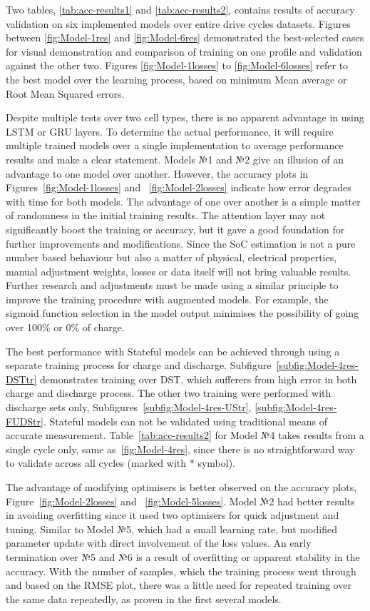 Two tables, \ref{tab:acc-results1} and \ref{tab:acc-results2}, contains results of accuracy validation on six implemented models over entire drive cycles datasets.
Figures between \ref{fig:Model-1res} and \ref{fig:Model-6res} demonstrated the best-selected cases for visual demonstration and comparison of training on one profile and validation against the other two.
Figures \ref{fig:Model-1losses} to \ref{fig:Model-6losses} refer to the best model over the learning process, based on minimum Mean average or Root Mean Squared errors.

%
%
Despite multiple tests over two cell types, there is no apparent advantage in using LSTM or GRU layers.
To determine the actual performance, it will require multiple trained models over a single implementation to average performance results and make a clear statement.
Models №1 and №2 give an illusion of an advantage to one model over another.
However, the accuracy plots in Figures~\ref{fig:Model-1losses} and ~\ref{fig:Model-2losses} indicate how error degrades with time for both models.
The advantage of one over another is a simple matter of randomness in the initial training results.
The attention layer may not significantly boost the training or accuracy, but it gave a good foundation for further improvements and modifications.
Since the SoC estimation is not a pure number based behaviour but also a matter of physical, electrical properties, manual adjustment weights, losses or data itself will not bring valuable results.
Further research and adjustments must be made using a similar principle to improve the training procedure with augmented models. 
For example, the sigmoid function selection in the model output minimises the possibility of going over 100\% or 0\% of charge.

%
%
The best performance with Stateful models can be achieved through using a separate training process for charge and discharge. 
Subfigure~\ref{subfig:Model-4res-DSTtr} demonstrates training over DST, which sufferers from high error in both charge and discharge process.
The other two training were performed with discharge sets only, Subfigures~\ref{subfig:Model-4res-UStr}, \ref{subfig:Model-4res-FUDStr}.
Stateful models can not be validated using traditional means of accurate measurement.
Table~\ref{tab:acc-results2} for Model №4 takes results from a single cycle only, same as~\ref{fig:Model-4res}, since there is no straightforward way to validate across all cycles (marked with $*$ symbol).

%
%
The advantage of modifying optimisers is better observed on the accuracy plots, Figure~\ref{fig:Model-2losses} and ~\ref{fig:Model-5losses}.
Model №2 had better results in avoiding overfitting since it used two optimisers for quick adjustment and tuning.
Similar to Model №5, which had a small learning rate, but modified parameter update with direct involvement of the loss values.
An early termination over №5 and №6 is a result of overfitting or apparent stability in the accuracy.
With the number of samples, which the training process went through and based on the RMSE plot, there was a little need for repeated training over the same data repeatedly, as proven in the first several models.

